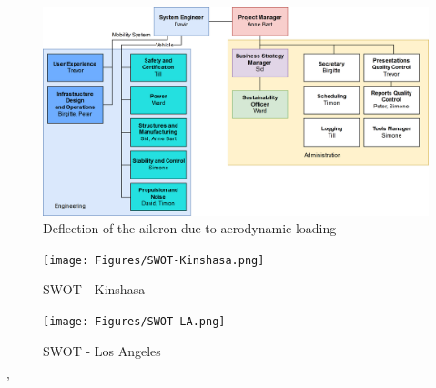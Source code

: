 \begin{figure}[H]
    \centering
    \includegraphics[width=0.75\linewidth]{Figures/organigram.png}
    \captionsetup{justification=centering}
    \caption{Deflection of the aileron due to aerodynamic loading \cite{Assignment}}
    \label{fig:deflection aileron}
\end{figure}



\begin{figure}[H]
  \centering
  \begin{minipage}[b]{0.4\textwidth}
    \texttt{[image: Figures/SWOT-Kinshasa.png]}
    \captionsetup{justification=centering}
    \caption{SWOT - Kinshasa}
    \label{Kinshasaswot}
  \end{minipage}
  \hspace{1.5cm}
  \begin{minipage}[b]{0.4\textwidth}
    \texttt{[image: Figures/SWOT-LA.png]}
    \captionsetup{justification=centering}
    \caption{SWOT - Los Angeles }
    \label{LAswot}
  \end{minipage}
\end{figure}

'

















